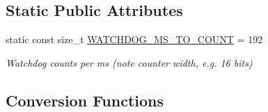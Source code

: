 \subsection*{Static Public Attributes}
\begin{DoxyCompactItemize}
\item 
static const size\-\_\-t \hyperlink{classsaw_robot_i_o1394_1_1osa_robot1394_a3d4cfdd12c7987826fb43028bd06e4b5}{W\-A\-T\-C\-H\-D\-O\-G\-\_\-\-M\-S\-\_\-\-T\-O\-\_\-\-C\-O\-U\-N\-T} = 192
\begin{DoxyCompactList}\small\item\em Watchdog counts per ms (note counter width, e.\-g. 16 bits) \end{DoxyCompactList}\end{DoxyCompactItemize}
\subsection*{Conversion Functions}
\label{_amgrpf75c7e767a0acc58e1bb77c3595a5698}%
